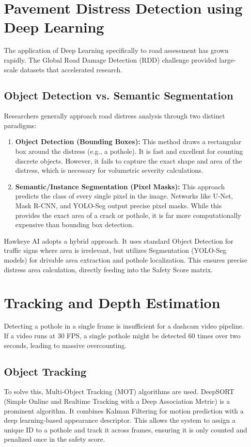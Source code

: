 \section{Pavement Distress Detection using Deep Learning}
The application of Deep Learning specifically to road assessment has grown rapidly. The Global Road Damage Detection (RDD) challenge \cite{rdd2022} provided large-scale datasets that accelerated research. 

\subsection{Object Detection vs. Semantic Segmentation}
Researchers generally approach road distress analysis through two distinct paradigms:
\begin{enumerate}
    \item \textbf{Object Detection (Bounding Boxes):} This method draws a rectangular box around the distress (e.g., a pothole). It is fast and excellent for counting discrete objects. However, it fails to capture the exact shape and area of the distress, which is necessary for volumetric severity calculations.
    \item \textbf{Semantic/Instance Segmentation (Pixel Masks):} This approach predicts the class of every single pixel in the image. Networks like U-Net, Mask R-CNN, and YOLO-Seg output precise pixel masks. While this provides the exact area of a crack or pothole, it is far more computationally expensive than bounding box detection.
\end{enumerate}

Hawkeye AI adopts a hybrid approach. It uses standard Object Detection for traffic signs where area is irrelevant, but utilizes Segmentation (YOLO-Seg models) for drivable area extraction and pothole localization. This ensures precise distress area calculation, directly feeding into the Safety Score matrix.

\section{Tracking and Depth Estimation}
Detecting a pothole in a single frame is insufficient for a dashcam video pipeline. If a video runs at 30 FPS, a single pothole might be detected 60 times over two seconds, leading to massive overcounting.

\subsection{Object Tracking}
To solve this, Multi-Object Tracking (MOT) algorithms are used. DeepSORT (Simple Online and Realtime Tracking with a Deep Association Metric) \cite{wojke2017simple} is a prominent algorithm. It combines Kalman Filtering for motion prediction with a deep learning-based appearance descriptor. This allows the system to assign a unique ID to a pothole and track it across frames, ensuring it is only counted and penalized once in the safety score.

